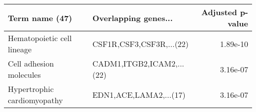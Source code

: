 \begin{tabular}{llr}
\toprule
             Term name (47) &      Overlapping genes... &  Adjusted p-value \\
\midrule
 Hematopoietic cell lineage &  CSF1R,CSF3,CSF3R,...(22) &          1.89e-10 \\
    Cell adhesion molecules & CADM1,ITGB2,ICAM2,...(22) &          3.16e-07 \\
Hypertrophic cardiomyopathy &    EDN1,ACE,LAMA2,...(17) &          3.16e-07 \\
\bottomrule
\end{tabular}
